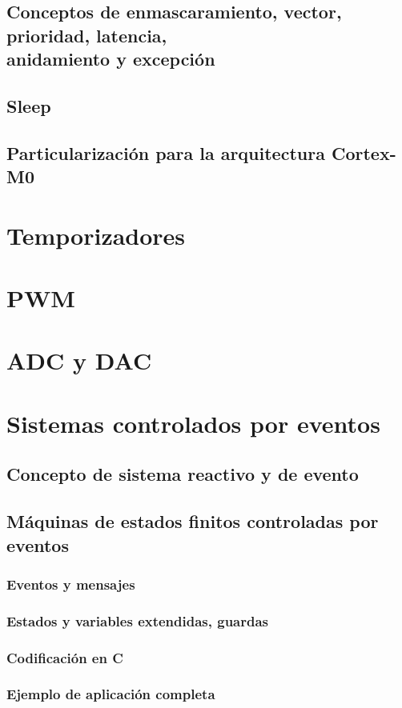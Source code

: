 \documentclass[a4paper]{book}
\begin{document}
\subsection{\texorpdfstring{Conceptos de enmascaramiento, vector, prioridad, latencia,\\ anidamiento y excepción}{Conceptos de enmascaramiento, vector, prioridad, latencia, anidamiento y excepción}}
\subsection{Sleep}
\subsection{Particularización para la arquitectura Cortex-M0}
\section{Temporizadores}
\section{PWM}
\section{ADC y DAC}
\section{Sistemas controlados por eventos}
\subsection{Concepto de sistema reactivo y de evento}
\subsection{Máquinas de estados finitos controladas por eventos}
\subsubsection{Eventos y mensajes}
\subsubsection{Estados y variables extendidas, guardas}
\subsubsection{Codificación en C}
\subsubsection{Ejemplo de aplicación completa}
\end{document}
